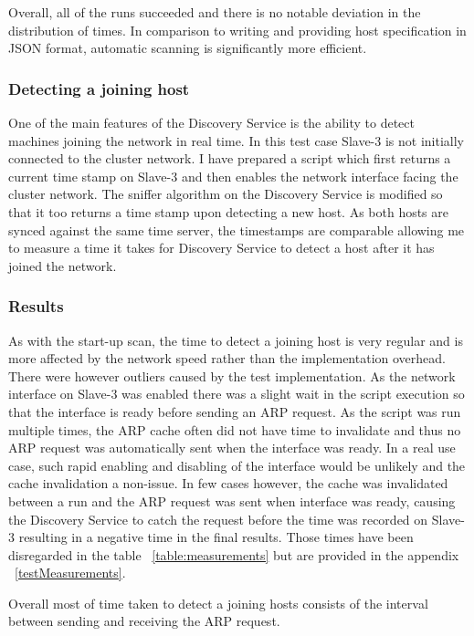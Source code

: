 Overall, all of the runs succeeded and there is no notable deviation in the distribution of times. In comparison to writing and providing host specification in JSON format, automatic scanning is significantly more efficient.

\subsubsection{Detecting a joining host} \label{joining_host}

One of the main features of the Discovery Service is the ability to detect machines joining the network in real time. In this test case Slave-3 is not initially connected to the cluster network. I have prepared a script which first returns a current time stamp on Slave-3 and then enables the network interface facing the cluster network. The sniffer algorithm on the Discovery Service is modified so that it too returns a time stamp upon detecting  a new host. As both hosts are synced against the same time server, the timestamps are comparable allowing me to measure a time it takes for Discovery Service to detect a host after it has joined the network.

\subsubsection*{Results}

As with the start-up scan, the time to detect a joining host is very regular and is more affected by the network speed rather than the implementation overhead. There were however outliers caused by the test implementation. As the network interface on Slave-3 was enabled there was a slight wait in the script execution so that the interface is ready before sending an ARP request. As the script was run multiple times, the ARP cache often did not have time to invalidate and thus no ARP request was automatically sent when the interface was ready. In a real use case, such rapid enabling and disabling of the interface would be unlikely and the cache invalidation a non-issue. In few cases however, the cache was invalidated between a run and the ARP request was sent when interface was ready, causing the Discovery Service to catch the request before the time was recorded on Slave-3 resulting in a negative time in the final results. Those times have been disregarded in the table ~\ref{table:measurements} but are provided in the appendix ~\ref{testMeasurements}.

Overall most of time taken to detect a joining hosts consists of the interval between sending and receiving the ARP request.

